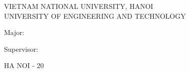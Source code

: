 \begin{titlepage}
  \uetTitlepageBorder
  \centering

  {\uetCoverHeaderFont VIETNAM NATIONAL UNIVERSITY, HANOI\\ UNIVERSITY OF ENGINEERING AND TECHNOLOGY\par}
  \vspace{2.5cm}

  {\uetCoverNameFont \authorNameEn\par}
  \vspace{2.5cm}

  {\uetCoverTitleFont \thesisTitleEn\par}
  \vspace{2cm}

  {\uetCoverNameFont Major: \majorEn\par}
  \vfill

  {\uetCoverNameFont Supervisor: \supervisorName\par}
  \ifdefempty{\coSupervisorName}{}{%
    \vspace{1cm}
    {\uetCoverNameFont Co-Supervisor: \coSupervisorName\par}%
  }
  \vspace{2cm}

  {\uetCoverYearFont HA NOI - 20\par}

  \restoregeometry
\end{titlepage}
